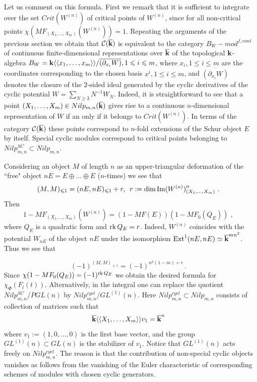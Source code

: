 \documentclass[12pt]{article}
\begin{document}
Let us comment on this formula. First we remark that it is sufficient to integrate over the set $Crit(W^{(n)})$ of critical points of $W^{(n)}$, since for all non-critical points $\chi(MF_{(X_1,\dots,X_m)}(W^{(n)}))=1$. Repeating the arguments of the previous section we obtain that ${\mathcal C}({\overline{\bf k}})$ is equivalent to the category $B_W-mod^{f,cont}$ of continuous finite-dimensional representations over ${\overline{\bf k}}$ of the topological ${\bf k}$-algebra
$B_W={\bf k}\langle\langle x_1,\dots,x_m\rangle\rangle/\overline{(\partial_{x_i}W)}, 1\leqslant i\leqslant m$, where $x_i,1\leqslant i\leqslant m$ are the coordinates corresponding to the chosen basis $x^i, 1\leqslant i\leqslant m$, and  $\overline{(\partial_{x_i}W)}$ denotes the closure of the $2$-sided ideal generated by the cyclic derivatives of the cyclic potential
$W=\sum_{N\geqslant 3}N ^{-1} W_N$. Indeed, it is straightforward to see that a point $(X_1,\dots,X_m)\in Nilp_{m,n}({\overline{\bf k}})$ gives rise to a continuous $n$-dimensional representation of $W$ if an only if it belongs to $Crit(W^{(n)})$. In terms of the category
${\mathcal C}({\overline{\bf k}})$ these points correspond to  $n$-fold extensions of the Schur object $E$ by itself. Special cyclic modules correspond to critical points belonging to $Nilp_{m,n}^{SC}\subset Nilp_{m,n}$.

Considering an object $M$ of length $n$ as an upper-triangular deformation of the ``free" object $nE=E\oplus\dots\oplus E$ ($n$-times) we see that
$$(M,M)_{\leqslant 1}=(nE,nE)_{\leqslant 1}+r,\,\,\,r:=\dim \operatorname{Im}(W^{(n)})^{\prime\prime}_{(X_1,\dots,X_m)}\,\,.$$
Then
$$1-MF_{(X_1,\dots,X_m)}(W^{(n)})=(1-MF(E))(1-MF_0(Q_E))\,\,,$$
where $Q_E$ is a quadratic form and $\operatorname{rk}Q_E=r$.
Indeed, $W^{(n)}$ coincides with the potential $W_{nE}$ of the object $nE$ under the isomorphism $\operatorname{Ext}^1(nE,nE)\simeq {\overline{\bf k}}^{mn^2}$. Thus we see that 


$$(-1)^{(M,M)_{\leqslant 1}}=(-1)^{n^2(1-m)+r}\,.$$ Since $\chi(1-MF_0(Q_E))=(-1)^{\operatorname{rk}Q_E}$ we obtain the desired formula for $\chi_\Phi(F_l(t))$.
Alternatively, in the integral one can replace the quotient $Nilp_{m,n}^{SC}/PGL(n)$ by $Nilp_{m,n}^{cycl}/GL^{(1)}(n)$. Here $Nilp_{m,n}^{cycl}\subset Nilp_{m,n}$
consists of collection of matrices such that $${\overline{\bf k}}\langle\langle X_1,\dots,X_m\rangle\rangle v_1={\overline{\bf k}}^n$$ where $v_1:=(1,0,\dots,0)$ is the first base vector, and the group $GL^{(1)}(n)\subset GL(n)$ is the stabilizer of $v_1$. Notice that $GL^{(1)}(n)$ acts freely on $Nilp_{m,n}^{cycl}$.
   The reason is that the contribution of non-special cyclic objects vanishes as follows from the vanishing of the Euler characteristic
 of corresponding schemes of modules with chosen cyclic generators. 
\end{document}
